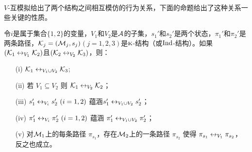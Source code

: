  $V$-互模拟给出了两个结构之间相互模仿的行为关系，下面的命题给出了这种关系一些关键的性质。
 \begin{proposition}\label{prop:bisimilar:V}
 	令$i$是属于集合$\{1,2\}$的变量，$V_1$和$V_2$是${\cal A}$的子集，$s_1'$和$s_2'$是两个状态，$\pi_1'$和$\pi_2'$是两条路径，${\cal K}_j=({\cal M}_j,s_j)$$(j=1,2,3)$是$\textsc{k}$-结构（或$\textrm{Ind}$-结构）。如果$({\cal K}_1 \leftrightarrow_{V_1} {\cal K}_2)$且$({\cal K}_2 \leftrightarrow_{V_2} {\cal K}_3)$，则：
 	\begin{itemize}
 		\item[(i)] ${\cal K}_1\leftrightarrow_{V_1\cup V_2}{\cal K}_3$;
 		\item[(ii)] 若 $V_1 \subseteq V_2$ 则 ${\cal K}_1 \leftrightarrow_{V_2} {\cal K}_2$；
 		\item[(iii)] $s_1'\leftrightarrow_{V_i}s_2'~(i=1,2)$ 蕴涵$s_1'\leftrightarrow_{V_1\cup V_2}s_2'$；
 		\item[(iv)] $\pi_1'\leftrightarrow_{V_i}\pi_2'~(i=1,2)$ 蕴涵 $\pi_1'\leftrightarrow_{V_1\cup V_2}\pi_2'$；
 		\item[(v)] 对${\cal M}_1$上的每条路径 $\pi_{s_1}$，存在${\cal M}_2$上的一条路径 $\pi_{s_2}$ 使得 $\pi_{s_1} \leftrightarrow_{V_1} \pi_{s_2}$，反之也成立。
 	\end{itemize}
 \end{proposition}
